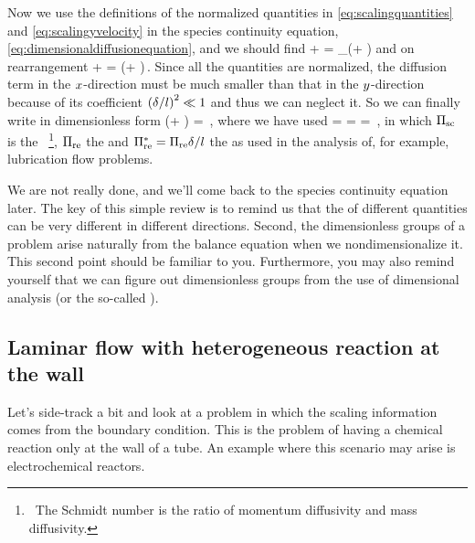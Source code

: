 Now we use the definitions of the normalized quantities in \cref{eq:scalingquantities} and \cref{eq:scalingyvelocity} in the species continuity equation, \cref{eq:dimensionaldiffusionequation}, and we should find
\beq
\dfrac{\fsvel}{\length}\ndvelx\xpd\ndconc\ndposx + \dfrac{\fsvel\blthck}{\blthck\length}\ndvely\xpd\conc\ndposy =
\kmdiff_{}\left(\conc\ndposx + \conc\ndposy\right)
\eeq
and on rearrangement
\beq
\ndvelx\xpd\conc\ndposx + \ndvely\xpd\conc\ndposy =
\left(\conc\ndposx + \conc\ndposy\right)\,.
\eeq
Since all the quantities are normalized, the diffusion term in the $x$-direction must be much smaller than that in the $y$-direction because of its coefficient $\left(\delta/l\right)^2\ll 1$ and thus we can neglect it. So we can finally write in dimensionless form
\bneq\label{eq:dimlessspeciescontinuity}
\kschmidt\kredrey\left(\ndvelx\cder\conc\ndposx + \ndvely\cder\conc\ndposy\right) = \cder\conc{\ndposy\ndposy}\,,
\eneq
where we have used
\beq
{} = 
\dfrac{\kvisc}{\fsvel\blthck}\dfrac{\length}{\blthck} =
\dfrac{\length}{\blthck} = 
\,,
\eeq
in which $\Pi_\text{sc}$ is the ~\footnote{~The Schmidt number is the ratio of momentum diffusivity and mass diffusivity.}, $\Pi_\text{re}$ the  and $\Pi^*_\text{re} = \Pi_\text{re}\delta/l$ the  as used in the analysis of, for example, lubrication flow problems.

We are not really done, and we'll come back to the species continuity equation later. The key of this simple review is to remind us that the  of different quantities can be very different in different directions. Second, the dimensionless groups of a problem arise naturally from the balance equation when we nondimensionalize it. This second point should be familiar to you. Furthermore, you may also remind yourself that we can figure out dimensionless groups from the use of dimensional analysis (or the so-called ).


\subsection{Laminar flow with heterogeneous reaction at the wall}
Let's side-track a bit and look at a problem in which the scaling information comes from the boundary condition. This is the problem of having a chemical reaction only at the wall of a tube. An example where this scenario may arise is electrochemical reactors.


